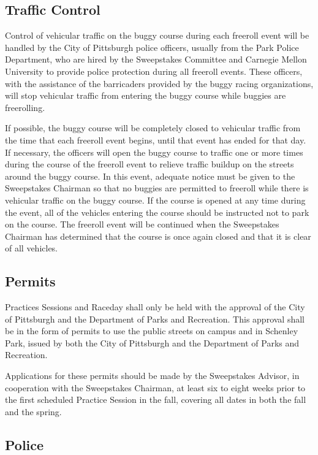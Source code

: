 \subsection{Traffic Control}

	Control of vehicular traffic on the buggy course during each freeroll event
	will be handled by the City of Pittsburgh police officers, usually from
	the Park Police Department, who are hired by the Sweepstakes Committee and
	Carnegie Mellon University to provide police protection during all freeroll
	events. These officers, with the assistance of the barricaders provided
	by the buggy racing organizations, will stop vehicular traffic from entering
	the buggy course while buggies are freerolling.

	If possible, the buggy course will be completely closed to vehicular traffic
	from the time that each freeroll event begins, until that event
	has ended for that day. If necessary, the officers will open the buggy course
	to traffic one or more times during the course of the freeroll event
	to relieve traffic buildup on the streets around the buggy course. In this
	event, adequate notice must be given to the Sweepstakes Chairman so that no
	buggies are permitted to freeroll while there is vehicular traffic on the buggy
	course. If the course is opened at any time during the event, all of
	the vehicles entering the course should be instructed not to park on the
	course. The freeroll event will be continued when the Sweepstakes Chairman has
	determined that the course is once again closed and that it is clear of all
	vehicles.


\subsection{Permits}

	Practices Sessions and Raceday shall only be held with the approval of the City of
	Pittsburgh and the Department of Parks and Recreation. This approval shall be
	in the form of permits to use the public streets on campus and in Schenley
	Park, issued by both the City of Pittsburgh and the Department of Parks and Recreation.

	Applications for these permits should be made by the Sweepstakes Advisor, in
	cooperation with the Sweepstakes Chairman, at least six to eight weeks
	prior to the first scheduled Practice Session in the fall,
	covering all dates in both the fall and the spring.


\subsection{Police}

